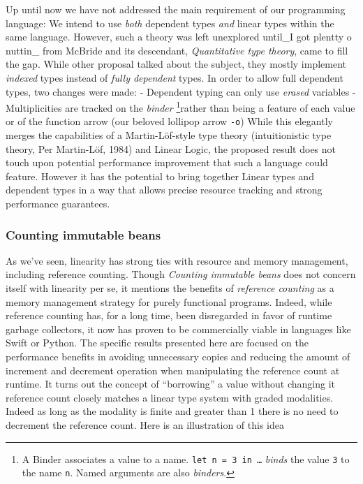\documentclass[
]{article}
\begin{document}
Up until now we have not addressed the main requirement of our
programming language: We intend to use \emph{both} dependent types
\emph{and} linear types within the same language. However, such a theory
was left unexplored until\_I got plentty o nuttin\_ from McBride and its
descendant, \emph{Quantitative type theory}, came to fill the gap. While
other proposal talked about the subject, they mostly implement
\emph{indexed} types instead of \emph{fully dependent} types. In order
to allow full dependent types, two changes were made: - Dependent typing
can only use \emph{erased} variables - Multiplicities are tracked on the
\emph{binder} \footnote{A Binder associates a value to a name.
  \texttt{let\ n\ =\ 3\ in\ \ldots{}} \emph{binds} the value \texttt{3}
  to the name \texttt{n}. Named arguments are also \emph{binders}.}rather
than being a feature of each value or of the function arrow (our beloved
lollipop arrow \texttt{-o}) While this elegantly merges the capabilities
of a Martin-Löf-style type theory (intuitionistic type theory, Per
Martin-Löf, 1984) and Linear Logic, the proposed result does not touch
upon potential performance improvement that such a language could
feature. However it has the potential to bring together Linear types and
dependent types in a way that allows precise resource tracking and
strong performance guarantees.

\hypertarget{counting-immutable-beans}{%
\subsubsection{Counting immutable
beans}\label{counting-immutable-beans}}

As we've seen, linearity has strong ties with resource and memory
management, including reference counting. Though \emph{Counting
immutable beans} does not concern itself with linearity per se, it
mentions the benefits of \emph{reference counting} as a memory
management strategy for purely functional programs. Indeed, while
reference counting has, for a long time, been disregarded in favor of
runtime garbage collectors, it now has proven to be commercially viable
in languages like Swift or Python. The specific results presented here
are focused on the performance benefits in avoiding unnecessary copies
and reducing the amount of increment and decrement operation when
manipulating the reference count at runtime. It turns out the concept of
``borrowing'' a value without changing it reference count closely
matches a linear type system with graded modalities. Indeed as long as
the modality is finite and greater than 1 there is no need to decrement
the reference count. Here is an illustration of this idea
\end{document}
